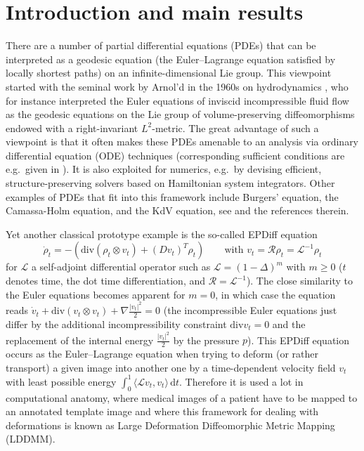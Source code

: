 \documentclass[a4paper, 12pt]{article}
\renewcommand{\d}{\mathrm{d}}
\renewcommand{\div}{\mathrm{div}}
\newcommand{\Riesz}{\mathcal{R}}
\renewcommand{\L}{\mathcal{L}}
\begin{document}
\section{Introduction and main results}
There are a number of partial differential equations (PDEs) that can be interpreted as a geodesic equation (the Euler--Lagrange equation satisfied by locally shortest paths) on an infinite-dimensional Lie group.
This viewpoint started with the seminal work by Arnol'd in the 1960s on hydrodynamics \cite{Ar66},
who for instance interpreted the Euler equations of inviscid incompressible fluid flow as the geodesic equations on the Lie group of volume-preserving diffeomorphisms endowed with a right-invariant $L^2$-metric.
The great advantage of such a viewpoint is that it often makes these PDEs amenable to an analysis via ordinary differential equation (ODE) techniques
(corresponding sufficient conditions are e.g.\ given in \cite{Ko17}).
It is also exploited for numerics, e.g.\ by devising efficient, structure-preserving solvers based on Hamiltonian system integrators.
Other examples of PDEs that fit into this framework include Burgers' equation, the Camassa-Holm equation, and the KdV equation, see \cite{MiPr10,KhWe09,Ko17} and the references therein.

Yet another classical prototype example is the so-called EPDiff equation
\begin{equation}\label{eqn:EPDiffIntro}
\dot\rho_t=-(\div(\rho_t\otimes v_t)+(Dv_t)^T\rho_t)
\qquad\text{with }
v_t=\Riesz\rho_t=\L^{-1}\rho_t
\end{equation}
for $\L$ a self-adjoint differential operator such as $\L=(1-\Delta)^m$ with $m\geq0$ ($t$ denotes time, the dot time differentiation, and $\Riesz=\L^{-1}$).
The close similarity to the Euler equations becomes apparent for $m=0$, in which case the equation reads $\dot v_t+\div(v_t\otimes v_t)+\nabla\frac{|v_t|^2}2=0$
(the incompressible Euler equations just differ by the additional incompressibility constraint $\div v_t=0$ and the replacement of the internal energy $\frac{|v_t|^2}2$ by the pressure $p$).
This EPDiff equation occurs as the Euler--Lagrange equation when trying to deform (or rather transport) a given image into another one by a time-dependent velocity field $v_t$
with least possible energy $\int_0^1\langle\L v_t,v_t\rangle\,\d t$.
Therefore it is used a lot in computational anatomy, where medical images of a patient have to be mapped to an annotated template image
and where this framework for dealing with deformations is known as Large Deformation Diffeomorphic Metric Mapping (LDDMM).
\end{document}
